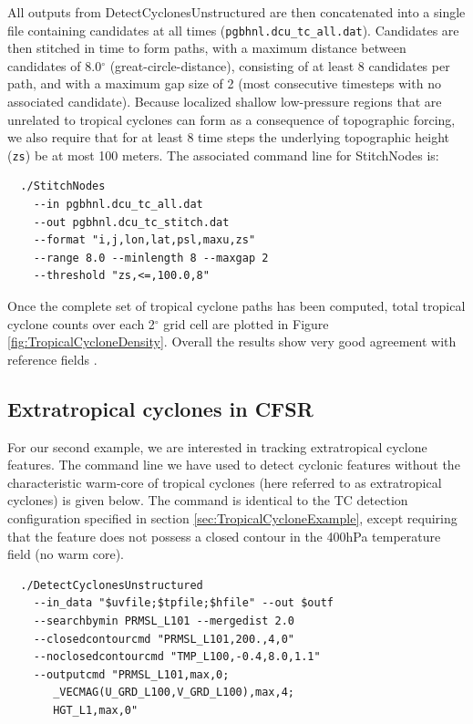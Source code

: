 \documentclass[gmdd, hvmath, online]{copernicus_discussions}
\begin{document}
All outputs from DetectCyclonesUnstructured are then concatenated into a single file containing candidates at all times (\texttt{pgbhnl.dcu\_tc\_all.dat}).  Candidates are then stitched in time to form paths, with a maximum distance between candidates of 8.0$^\circ$ (great-circle-distance), consisting of at least 8 candidates per path, and with a maximum gap size of 2 (most consecutive timesteps with no associated candidate).  Because localized shallow low-pressure regions that are unrelated to tropical cyclones can form as a consequence of topographic forcing, we also require that for at least 8 time steps the underlying topographic height (\texttt{zs}) be at most 100 meters.  The associated command line for StitchNodes is:

{\small \begin{verbatim}
  ./StitchNodes
    --in pgbhnl.dcu_tc_all.dat
    --out pgbhnl.dcu_tc_stitch.dat
    --format "i,j,lon,lat,psl,maxu,zs"
    --range 8.0 --minlength 8 --maxgap 2
    --threshold "zs,<=,100.0,8"
\end{verbatim}}

Once the complete set of tropical cyclone paths has been computed, total tropical cyclone counts over each 2$^\circ$ grid cell are plotted in Figure \ref{fig:TropicalCycloneDensity}.  Overall the results show very good agreement with reference fields \citep{Gray1968,Knapp2010}.

\subsection{Extratropical cyclones in CFSR} \label{sec:ExtratropicalCycloneExample}

For our second example, we are interested in tracking extratropical cyclone features.  The command line we have used to detect cyclonic features without the characteristic warm-core of tropical cyclones (here referred to as extratropical cyclones) is given below.  The command is identical to the TC detection configuration specified in section \ref{sec:TropicalCycloneExample}, except requiring that the feature does not possess a closed contour in the 400hPa temperature field (no warm core).

{\small \begin{verbatim}
  ./DetectCyclonesUnstructured
    --in_data "$uvfile;$tpfile;$hfile" --out $outf
    --searchbymin PRMSL_L101 --mergedist 2.0
    --closedcontourcmd "PRMSL_L101,200.,4,0"
    --noclosedcontourcmd "TMP_L100,-0.4,8.0,1.1"
    --outputcmd "PRMSL_L101,max,0;
       _VECMAG(U_GRD_L100,V_GRD_L100),max,4;
       HGT_L1,max,0"
\end{verbatim}}
\end{document}
